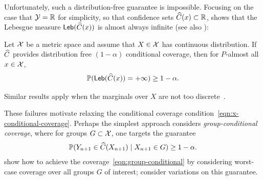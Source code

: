 \documentclass[11pt]{article}
\begin{document}
Unfortunately, such a distribution-free guarantee is impossible.
%
Focusing on the case that $\mathcal{Y} = \mathbb{R}$ for simplicity, so that confidence
sets $\widehat{C}(x) \subset \mathbb{R}$, \citet[Proposition 4]{Vovk12} shows that
the Lebesgue measure $\mathsf{Leb}(\widehat{C}(x))$ is almost always infinite
(see also \citet{BarberCaRaTi21a}):
\begin{corollary}
  Let $\mathcal{X}$ be a metric space and assume that $X \in \mathcal{X}$ has
  continuous distribution.
  If $\widehat{C}$ provides distribution free $(1 - \alpha)$ conditional
  coverage, then for $P$-almost all
  $x \in \mathcal{X}$,
  \begin{equation*}
    \mathbb{P}(\mathsf{Leb}(\widehat{C}(x)) = + \infty) \ge 1 - \alpha.
  \end{equation*}
\end{corollary}
\noindent
Similar results apply when the marginals over $X$ are not
too discrete~\cite[Corollary 7.1]{DuchiGuJiSu24}.

These failures motivate relaxing the conditional coverage
condition~\eqref{eqn:x-conditional-coverage}.
%
Perhaps the simplest approach considers
\emph{group-conditional coverage}, where for groups
$G \subset \mathcal{X}$, one targets the guarantee
\begin{align}
  \label{eqn:group-conditional}
  \mathbb{P}(Y_{n + 1} \in \widehat{C}(X_{n + 1}) \mid X_{n + 1} \in G) \ge 1 - \alpha.
\end{align}
\citet[Sec.~4]{BarberCaRaTi21a} show how to achieve the
coverage~\eqref{eqn:group-conditional} by considering worst-case coverage
over all groups $G$ of interest; \citet{JungNoRaRo23} consider
variations on this guarantee. %
\end{document}
